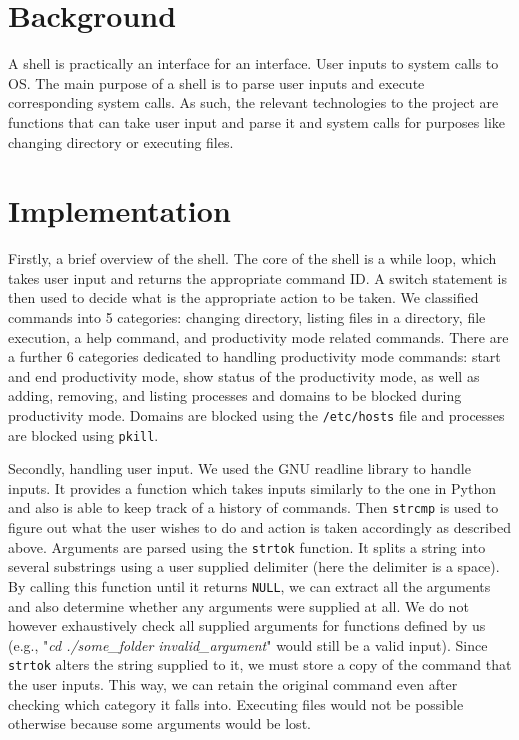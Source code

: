 \documentclass{article}
\begin{document}
\section{Background}

A shell is practically an interface for an interface. User inputs to system calls to OS. The main purpose of a shell is to parse user inputs and execute corresponding system calls. As such, the relevant technologies to the project are functions that can take user input and parse it and system calls for purposes like changing directory or executing files.

\section{Implementation}

Firstly, a brief overview of the shell. The core of the shell is a while loop, which takes user input and returns the appropriate command ID. A switch statement is then used to decide what is the appropriate action to be taken. We classified commands into 5 categories: changing directory, listing files in a directory, file execution, a help command, and productivity mode related commands. There are a further 6 categories dedicated to handling productivity mode commands: start and end productivity mode, show status of the productivity mode, as well as adding, removing, and listing processes and domains to be blocked during productivity mode. Domains are blocked using the \texttt{/etc/hosts} file and processes are blocked using \texttt{pkill}.

Secondly, handling user input. We used the GNU readline library to handle inputs. It provides a function which takes inputs similarly to the one in Python and also is able to keep track of a history of commands. Then  \texttt{strcmp} is used to figure out what the user wishes to do and action is taken accordingly as described above. Arguments are parsed using the  \texttt{strtok} function. It splits a string into several substrings using a user supplied delimiter (here the delimiter is a space). By calling this function until it returns  \texttt{NULL}, we can extract all the arguments and also determine whether any arguments were supplied at all. We do not however exhaustively check all supplied arguments for functions defined by us (e.g., "\textit{cd ./some\_folder invalid\_argument}" would still be a valid input). Since  \texttt{strtok} alters the string supplied to it, we must store a copy of the command that the user inputs. This way, we can retain the original command even after checking which category it falls into. Executing files would not be possible otherwise because some arguments would be lost.
\end{document}
